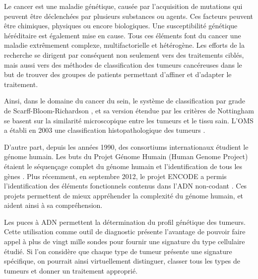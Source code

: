 		Le cancer est une maladie génétique, causée par l'acquisition de mutations qui peuvent être déclenchées par plusieurs substances ou agents.
		Ces facteurs peuvent être chimiques, physiques ou encore biologiques.
		Une susceptibilité génétique héréditaire est également mise en cause.
		Tous ces éléments font du cancer une maladie extrêmement complexe, multifactorielle et hétérogène.
		Les efforts de la recherche se dirigent par conséquent non seulement vers des traitements ciblés, mais aussi vers des méthodes de classification des tumeurs cancéreuses dans le but de trouver des groupes de patients permettant d'affiner et d'adapter le traitement.

		Ainsi, dans le domaine du cancer du sein, le système de classification par grade de Scarff-Bloom-Richardson \citep{Bloom1957}, et sa version étendue par les critères de Nottingham \citep{Elston1991} se basent sur la similarité microscopique entre les tumeurs et le tissu sain.
		L'\ac{OMS} a établi en 2003 une classification histopathologique des tumeurs \citep{WHO2003}.

		D'autre part, depuis les années 1990, des consortiums internationaux étudient le génome humain.
		Les buts du Projet Génome Humain (Human Genome Project) étaient le séquençage complet du génome humain et l'identification de tous les gènes \citep{HGP2001}.
		Plus récemment, en septembre 2012, le projet \ac{ENCODE} a permis l'identification des éléments fonctionnels contenus dans l'\acs{ADN} non-codant \citep{ENCODE2012}.
		Ces projets permettent de mieux appréhender la complexité du génome humain, et aident ainsi à sa compréhension.

		Les puces à \acs{ADN} permettent la détermination du profil génétique des tumeurs.
		Cette utilisation comme outil de diagnostic présente l'avantage de pouvoir faire appel à plus de vingt mille sondes pour fournir une signature du type cellulaire étudié.
		Si l'on considère que chaque type de tumeur présente une signature spécifique, on pourrait ainsi virtuellement distinguer, classer tous les types de tumeurs et donner un traitement approprié.

